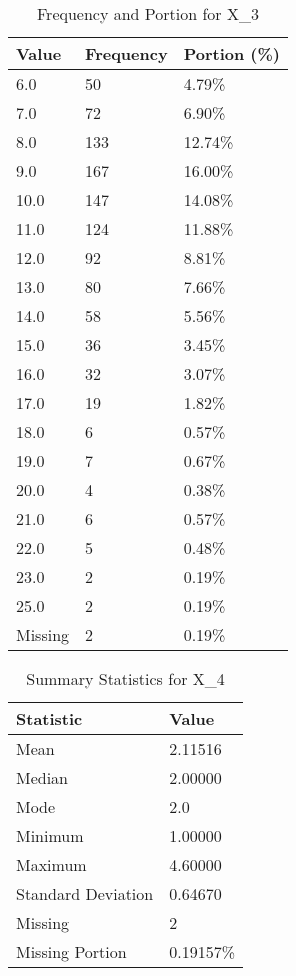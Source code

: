\begin{table}[H]
\centering
\begin{tabular}{|l|l|l|}
\hline
\textbf{Value} & \textbf{Frequency} & \textbf{Portion (\%)} \\ \hline
6.0 & 50 & 4.79\% \\ \hline
7.0 & 72 & 6.90\% \\ \hline
8.0 & 133 & 12.74\% \\ \hline
9.0 & 167 & 16.00\% \\ \hline
10.0 & 147 & 14.08\% \\ \hline
11.0 & 124 & 11.88\% \\ \hline
12.0 & 92 & 8.81\% \\ \hline
13.0 & 80 & 7.66\% \\ \hline
14.0 & 58 & 5.56\% \\ \hline
15.0 & 36 & 3.45\% \\ \hline
16.0 & 32 & 3.07\% \\ \hline
17.0 & 19 & 1.82\% \\ \hline
18.0 & 6 & 0.57\% \\ \hline
19.0 & 7 & 0.67\% \\ \hline
20.0 & 4 & 0.38\% \\ \hline
21.0 & 6 & 0.57\% \\ \hline
22.0 & 5 & 0.48\% \\ \hline
23.0 & 2 & 0.19\% \\ \hline
25.0 & 2 & 0.19\% \\ \hline
Missing & 2 & 0.19\% \\ \hline
\end{tabular}
\caption{Frequency and Portion for X_3}
\end{table}

\begin{table}[H]
\centering
\begin{tabular}{|l|l|}
\hline
\textbf{Statistic} & \textbf{Value} \\ \hline
Mean               & 2.11516 \\ \hline
Median             & 2.00000 \\ \hline
Mode               & 2.0 \\ \hline
Minimum            & 1.00000 \\ \hline
Maximum            & 4.60000 \\ \hline
Standard Deviation & 0.64670 \\ \hline
Missing            & 2 \\ \hline
Missing Portion    & 0.19157\% \\ \hline
\end{tabular}
\caption{Summary Statistics for X_4}
\end{table}


